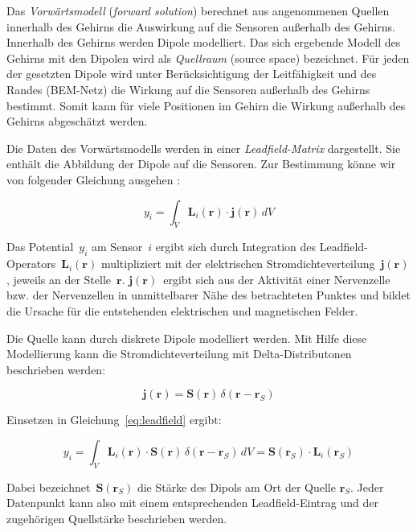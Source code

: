 \documentclass[doc,a4paper,12pt]{apa6}
\newcommand{\mx}[1]{\mathbf{#1}}
\begin{document}
Das \emph{Vorwärtsmodell} (\emph{forward solution}) berechnet aus angenommenen Quellen innerhalb des Gehirns die Auswirkung auf die Sensoren außerhalb des Gehirns. Innerhalb des Gehirns werden Dipole modelliert. Das sich ergebende Modell des Gehirns mit den Dipolen wird als \emph{Quellraum} (source space) bezeichnet. Für jeden der gesetzten Dipole wird unter Berücksichtigung der Leitfähigkeit und des Randes (BEM-Netz) die Wirkung auf die Sensoren außerhalb des Gehirns bestimmt. Somit kann für viele Positionen im Gehirn die Wirkung außerhalb des Gehirns abgeschätzt werden.

Die Daten des Vorwärtsmodells werden in einer \emph{Leadfield-Matrix} dargestellt. Sie enthält die Abbildung der Dipole auf die Sensoren. Zur Bestimmung könne wir von folgender Gleichung ausgehen \parencite{maurits2011neurology}:

\begin{equation}
y_i = \int_V \mx{L}_i (\mx{r}) \cdot \mx{j} (\mx{r})\, dV
\label{eq:leadfield}
\end{equation}

Das Potential~$y_i$ am Sensor~$i$ ergibt sich durch Integration des Leadfield-Operators~$\mx{L}_i(\mx{r})$ multipliziert mit der elektrischen Stromdichteverteilung~$\mx{j}(\mx{r})$, jeweils an der Stelle~$\mx{r}$. $\mx{j}(\mx{r})$~ergibt sich aus der Aktivität einer Nervenzelle bzw. der Nervenzellen in unmittelbarer Nähe des betrachteten Punktes und bildet die Ursache für die entstehenden elektrischen und magnetischen Felder.

Die Quelle kann durch diskrete Dipole modelliert werden. Mit Hilfe diese Modellierung kann die Stromdichteverteilung mit Delta-Distributonen beschrieben werden:

\begin{equation}
\mx{j} (\mx{r}) = \mx{S}(\mx{r})\,\delta(\mx{r}-\mx{r}_S)
\end{equation}

Einsetzen in Gleichung~\ref{eq:leadfield} ergibt:

\begin{equation}
y_i = \int_V \mx{L}_i (\mx{r}) \cdot \mx{S}(\mx{r})\,\delta(\mx{r}-\mx{r}_S)\, dV = \mx{S}(\mx{r}_S) \cdot \mx{L}_i(\mx{r}_S)
\label{eq:leadfield2}
\end{equation}

Dabei bezeichnet~$\mx{S}(\mx{r}_S)$ die Stärke des Dipols am Ort der Quelle $\mx{r}_S$. Jeder Datenpunkt kann also mit einem entsprechenden Leadfield-Eintrag und der zugehörigen Quellstärke beschrieben werden.
\end{document}
